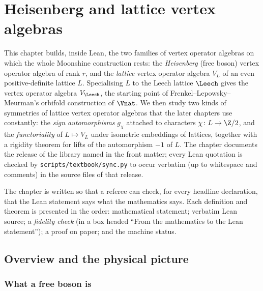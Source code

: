 \chapter{Heisenberg and lattice vertex algebras}\label{ch:03}
\begingroup\sloppy

\providecommand{\chthreeV}{V}
\providecommand{\chthreeF}{\mathcal{F}}
\providecommand{\chthreeeps}{\varepsilon}
\providecommand{\chthreecoc}{\operatorname{coc}}
\providecommand{\chthreeR}{\mathbb{R}}

This chapter builds, inside Lean, the two families of vertex operator algebras on which the whole
Moonshine construction rests: the \emph{Heisenberg} (free boson) vertex operator algebra of rank
$r$, and the \emph{lattice} vertex operator algebra $V_L$ of an even positive-definite lattice
$L$. Specialising $L$ to the Leech lattice $\Leech$ gives the vertex operator algebra $V_\Leech$,
the starting point of Frenkel--Lepowsky--Meurman's orbifold construction of $\Vnat$. We then
study two kinds of symmetries of lattice vertex operator algebras that the later chapters use
constantly: the \emph{sign automorphisms} $g_\chi$ attached to characters $\chi\colon L\to\Z/2$,
and the \emph{functoriality} of $L\mapsto V_L$ under isometric embeddings of lattices, together with
a rigidity theorem for lifts of the automorphism $-1$ of $L$. The chapter documents the release of the library named in the front matter; every Lean
quotation is checked by \texttt{scripts/textbook/sync.py} to occur verbatim (up to whitespace and
comments) in the source files of that release.

The chapter is written so that a referee can check, for every headline declaration, that the Lean
statement says what the mathematics says. Each definition and theorem is presented in the order:
mathematical statement; verbatim Lean source; a \emph{fidelity check} (in a box headed ``From the
mathematics to the Lean statement''); a proof on paper; and the machine status.

\section{Overview and the physical picture}\label{ch03:sec:overview}

\subsection{What a free boson is}

